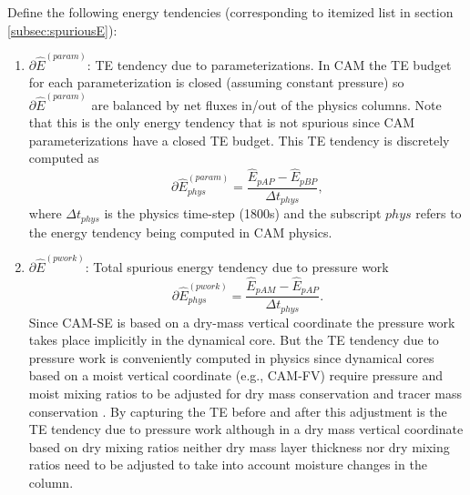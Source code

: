 \documentclass{agujournal}
\newcommand*{\gi}[1]{\widehat{#1}}
\begin{document}
Define the following energy tendencies (corresponding to itemized list in section \ref{subsec:spuriousE}):
\begin{enumerate}
%
\item $\partial \gi{E}^{(param)}$: TE tendency due to parameterizations. In CAM the TE budget for each parameterization is closed (assuming constant pressure) so $\partial \gi{E}^{(param)}$ are balanced by net fluxes in/out of the physics columns. Note that this is the only energy tendency that is not spurious since CAM parameterizations have a closed TE budget. This TE tendency is discretely computed as
\begin{equation}
\partial \gi{E}_{phys}^{({param})}=\frac{\gi{E}_{pAP}-\gi{E}_{pBP}}{\Delta t_{phys}},
\end{equation}
where $\Delta t_{phys}$ is the physics time-step (1800s) and the subscript $phys$ refers to the energy tendency being computed in CAM physics. 
%
\item $\partial \gi{E}^{({pwork})}$: Total spurious energy tendency due to pressure work
\begin{equation}
\partial \gi{E}_{phys}^{({pwork})}=\frac{\gi{E}_{pAM}-\gi{E}_{pAP}}{\Delta t_{phys}}.
\end{equation}
Since CAM-SE is based on a dry-mass vertical coordinate the pressure work takes place implicitly in the dynamical core. But the TE tendency due to pressure work is conveniently computed in physics since dynamical cores based on a moist vertical coordinate (e.g., CAM-FV) require pressure and moist mixing ratios to be adjusted for dry mass conservation and tracer mass conservation \citep[section 3.1.8 in ][]{CAM5}. By capturing the TE before and after this adjustment is the TE tendency due to pressure work although in a dry mass vertical coordinate based on dry mixing ratios neither dry mass layer thickness nor dry mixing ratios need to be adjusted to take into account moisture changes in the column.


\end{enumerate}
\end{document}
